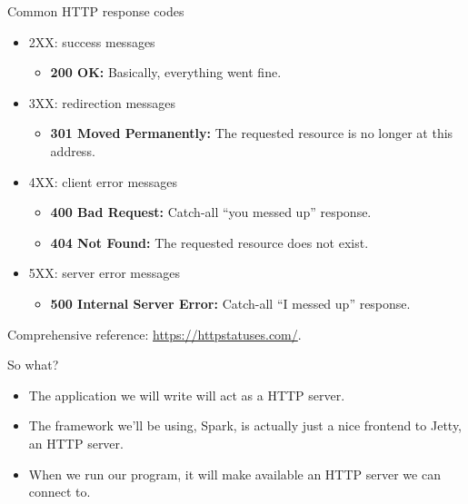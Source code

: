 \begin{frame}{Common HTTP response codes}
\begin{itemize}
    \item 2XX: success messages
    \begin{itemize}
        \item \textbf{200 OK:} Basically, everything went fine.
    \end{itemize}
    \item 3XX: redirection messages
    \begin{itemize}
        \item \textbf{301 Moved Permanently:} The requested resource is no longer at this address.
    \end{itemize}
    \item 4XX: client error messages
    \begin{itemize}
        \item \textbf{400 Bad Request:} Catch-all ``you messed up'' response.
        \item \textbf{404 Not Found:} The requested resource does not exist.
    \end{itemize}
    \item 5XX: server error messages
    \begin{itemize}
        \item \textbf{500 Internal Server Error:} Catch-all ``I messed up'' response.
    \end{itemize}
\end{itemize}
Comprehensive reference: \url{https://httpstatuses.com/}.
\end{frame}

\begin{frame}{So what?}
\begin{itemize}
    \item The application we will write will act as a HTTP server.
    \item The framework we'll be using, Spark, is actually just a nice frontend to Jetty, an HTTP server.
    \item When we run our program, it will make available an HTTP server we can connect to.
\end{itemize}
\end{frame}